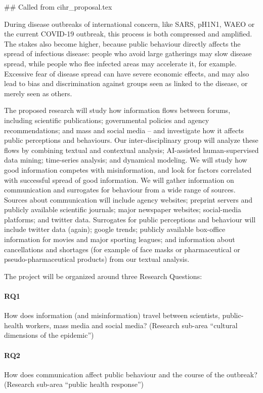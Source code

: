 
## Called from cihr_proposal.tex


During disease outbreaks of international concern, like SARS, pH1N1, WAEO  or the current COVID-19 outbreak, this process is both compressed and amplified. The stakes also become higher, because public behaviour directly affects the spread of infectious disease: people who avoid large gatherings may slow disease spread, while people who flee infected areas may accelerate it, for example. Excessive fear of disease spread can have severe economic effects, and may also lead to bias and discrimination against groups seen as linked to the disease, or merely seen as others.

The proposed research will study how information flows between forums, including scientific publications; governmental policies and agency recommendations; and mass and social media -- and investigate how it affects public perceptions and behaviours. 
Our inter-disciplinary group will analyze these flows by combining textual and contextual analysis; AI-assisted human-supervised data mining; time-series analysis; and dynamical modeling. We will study how good information competes with misinformation, and look for factors correlated with successful spread of good information. 
We will gather information on communication and surrogates for behaviour from a wide range of sources. 
Sources about communication will include agency websites; preprint servers and publicly available scientific journals; major newspaper websites; social-media platforms; and twitter data.
Surrogates for public perceptions and behaviour will include twitter data (again); google trends; publicly available box-office information for movies and major sporting leagues; and information about cancellations and shortages (for example of face masks or pharmaceutical or pseudo-pharmaceutical products) from our textual analysis. 

The project will be organized around three Research Questions:

\paragraph{RQ1} How does information (and misinformation) travel between scientists, public-health workers, mass media and social media? (Research sub-area ``cultural dimensions of the epidemic'')

\paragraph{RQ2} How does communication affect public behaviour and the course of the outbreak? (Research sub-area ``public health response'') 

